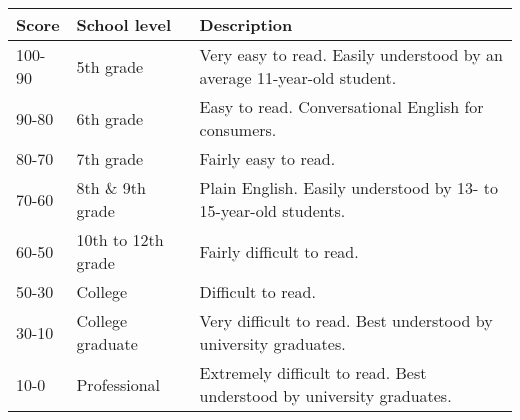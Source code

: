 \begin{tabular}{|l|l|p{75mm}|} \hline
\textbf{Score} & \textbf{School level} & \textbf{Description} \\ \hline
100-90 & 5th grade & Very easy to read. Easily understood by an average 11-year-old student. \\ \hline
90-80 & 6th grade & Easy to read. Conversational English for consumers. \\ \hline
80-70 & 7th grade & Fairly easy to read. \\ \hline
70-60 & 8th \& 9th grade & Plain English. Easily understood by 13- to 15-year-old students. \\ \hline
60-50 & 10th to 12th grade & Fairly difficult to read. \\ \hline
50-30 & College & Difficult to read. \\ \hline
30-10 & College graduate & Very difficult to read. Best understood by university graduates. \\ \hline
10-0 & Professional & Extremely difficult to read. Best understood by university graduates. \\ \hline
\end{tabular}